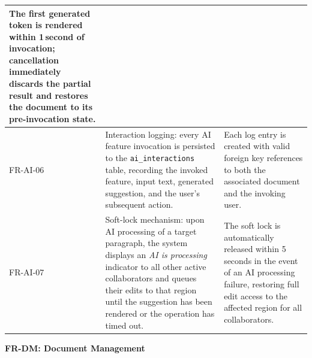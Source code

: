 \documentclass{article}
\begin{document}
{\begin{tabularx}{\textwidth}{|>{\hsize=0.2\hsize\raggedright\arraybackslash}X|>{\hsize=1.8\hsize\raggedright\arraybackslash}X|>{\hsize=1\hsize\raggedright\arraybackslash}X|}
    The first generated token is rendered within 1\,second of invocation; cancellation immediately discards the partial result and restores the document to its pre-invocation state. \\
    \hline
    FR-AI-06 &
    Interaction logging: every AI feature invocation is persisted to the \texttt{ai\_interactions} table, recording the invoked feature, input text, generated suggestion, and the user's subsequent action. &
    Each log entry is created with valid foreign key references to both the associated document and the invoking user. \\
    \hline
    FR-AI-07 &
    Soft-lock mechanism: upon AI processing of a target paragraph, the system displays an \textit{AI is processing} indicator to all other active collaborators and queues their edits to that region until the suggestion has been rendered or the operation has timed out. &
    The soft lock is automatically released within 5\,seconds in the event of an AI processing failure, restoring full edit access to the affected region for all collaborators. \\
    \hline
\end{tabularx}
}




\noindent\textbf{FR-DM: Document Management}
\vspace{5pt}
\end{document}
